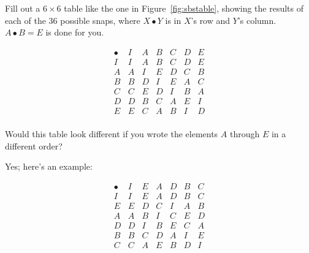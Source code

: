 \documentclass[../gatm_answers.tex]{subfiles}
\begin{document}
\newcommand\snap{\bullet}

\begin{outer_problem}[start=1]
	\item Fill out a $6\times 6$ table like the one in Figure~\ref{fig:sbstable}, showing the results of each of the $36$ possible snaps, where $X\snap Y$ is in $X$'s row and $Y$'s column.
	      $A\snap B=E$ is done for you.
\end{outer_problem}

%             
$$\begin{array}{ccccccc}
\snap & I & A & B & C & D & E \\
I & I & A & B & C & D & E \\
A & A & I & E & D & C & B \\
B & B & D & I & E & A & C \\
C & C & E & D & I & B & A \\
D & D & B & C & A & E & I \\
E & E & C & A & B & I & D \\
\end{array}$$

\begin{outer_problem}
	\item Would this table look different if you wrote the elements $A$ through $E$ in a different order?
\end{outer_problem}

Yes; here's an example:


$$\begin{array}{ccccccc}
\snap & I & E & A & D & B & C \\
I & I & E & A & D & B & C \\
E & E & D & C & I & A & B \\
A & A & B & I & C & E & D \\
D & D & I & B & E & C & A \\
B & B & C & D & A & I & E \\
C & C & A & E & B & D & I \\
\end{array}$$
\end{document}
